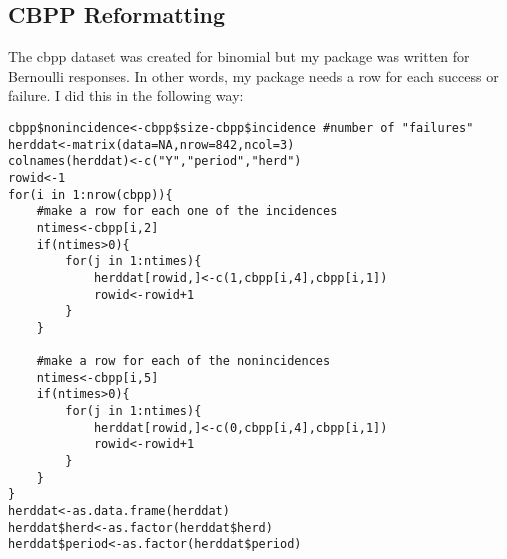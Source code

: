 \documentclass{article}
\begin{document}
\subsection{CBPP Reformatting}
The cbpp dataset was created for binomial but my package was written for Bernoulli responses. In other words, my package needs a row for each success or failure. I did this in the following way:
\begin{verbatim}
cbpp$nonincidence<-cbpp$size-cbpp$incidence #number of "failures"
herddat<-matrix(data=NA,nrow=842,ncol=3)
colnames(herddat)<-c("Y","period","herd")
rowid<-1
for(i in 1:nrow(cbpp)){
	#make a row for each one of the incidences 
	ntimes<-cbpp[i,2]
	if(ntimes>0){	
		for(j in 1:ntimes){
			herddat[rowid,]<-c(1,cbpp[i,4],cbpp[i,1])
			rowid<-rowid+1
		}
	}
	
	#make a row for each of the nonincidences
	ntimes<-cbpp[i,5]
	if(ntimes>0){	
		for(j in 1:ntimes){
			herddat[rowid,]<-c(0,cbpp[i,4],cbpp[i,1])
			rowid<-rowid+1
		}
	}
}
herddat<-as.data.frame(herddat)
herddat$herd<-as.factor(herddat$herd)
herddat$period<-as.factor(herddat$period)
\end{verbatim}
\end{document}
